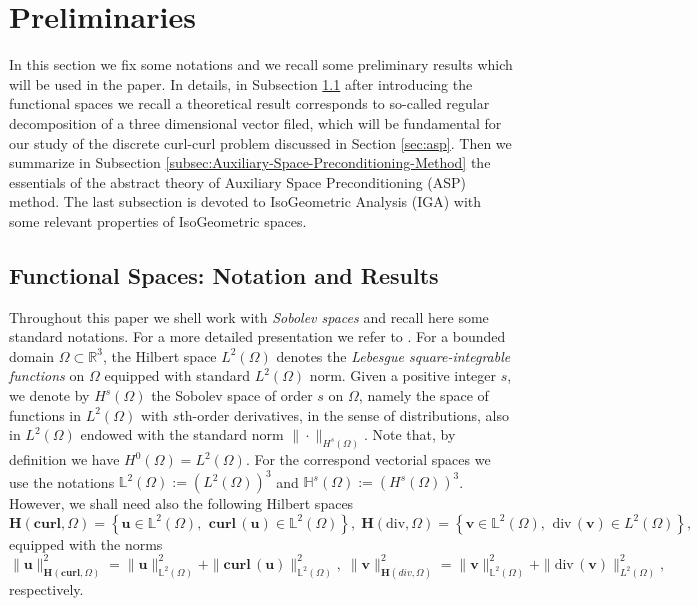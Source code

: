 \section{Preliminaries}
In this section we fix some notations and we recall some preliminary results which will be used in the paper. In details, in Subsection \ref{subsec:functional-spaces} after introducing the functional spaces we recall a theoretical result corresponds to so-called regular decomposition of a three dimensional vector filed, which will be fundamental for our study of the discrete curl-curl problem discussed in Section \ref{sec:asp}. Then we summarize in Subsection \ref{subsec:Auxiliary-Space-Preconditioning-Method} the essentials of the abstract theory of Auxiliary Space Preconditioning (ASP) method. The last subsection is devoted to IsoGeometric Analysis (IGA) with some relevant properties of IsoGeometric spaces.


    
\subsection{Functional Spaces: Notation and Results}\label{subsec:functional-spaces}
Throughout this paper we shell work with {\em Sobolev spaces} and recall here some standard notations. For a more detailed presentation we refer to \cite{adams2003sobolev,girault2012finite,monk2003finite}. For a bounded domain $\Omega \subset \mathbb{R}^3$, the Hilbert space $L^2(\Omega)$ denotes the {\em Lebesgue square-integrable functions} on $\Omega$ equipped with standard $L^2(\Omega)$ norm. Given a positive integer $s$, we denote by $H^s(\Omega)$ the Sobolev space of order $s$ on $\Omega$, namely the space of functions in $L^2(\Omega)$ with $s$th-order derivatives, in the sense of distributions, also in $L^2(\Omega)$ endowed with the standard norm $\|\cdot\|_{H^s(\Omega)}$. Note that, by definition we have $H^0(\Omega)=L^2(\Omega)$. For the correspond vectorial spaces we use the notations $\mathbb{L}^2(\Omega):=\left(L^2(\Omega)\right)^3$ and $\mathbb{H}^s(\Omega):=\left(H^s(\Omega)\right)^3$. However, we shall need also the following Hilbert spaces
\begin{equation*}
\bm{H}(\textbf{curl},\Omega)=\left\{ \bm{u} \in \mathbb{L}^2(\Omega),\: \, \textbf{curl}\,(\bm{u})\in \mathbb{L}^2(\Omega)\right\}, \; \bm{H}(\text{div},\Omega)=\left\{ \bm{v} \in \mathbb{L}^2(\Omega),\: \, \text{div}\,(\bm{v})\in L^2(\Omega)\right\},
\end{equation*}
equipped with the norms
\begin{equation*}
\|\bm{u}\|_{\bm{H}(\textbf{curl},\Omega)}^2=\|\bm{u}\|_{\mathbb{L}^2(\Omega)}^2 + \|\textbf{curl}\,(\bm{u})\|_{\mathbb{L}^2(\Omega)}^2, \; \|\bm{v}\|_{\bm{H}(div,\Omega)}^2=\|\bm{v}\|_{\mathbb{L}^2(\Omega)}^2 + \|\text{div}\,(\bm{v})\|_{L^2(\Omega)}^2,
\end{equation*}
respectively.

